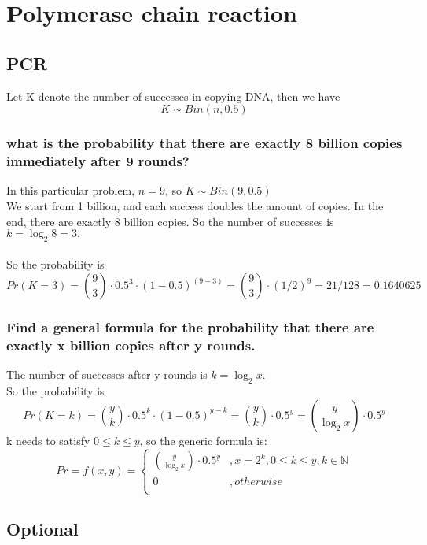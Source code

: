 \documentclass{article}
\date{February 2018}
\begin{document}
\section{Polymerase chain reaction}

\subsection{PCR}
Let K denote the number of successes in copying DNA, then we have 
\[
K \sim Bin(n, 0.5)
\]

\subsubsection{what is the probability that there are exactly 8 billion copies immediately after 9 rounds?}

In this particular problem, \( n = 9 \), so \( K \sim Bin(9, 0.5)\)\\
We start from 1 billion, and each success doubles the amount of copies. In the end, there are exactly 8 billion copies. So the number of successes is \( k = {\log_2 8} = 3. \) \\
\\
So the probability is \\
\[
Pr(K = 3) = {9 \choose 3} \cdot 0.5^3 \cdot (1 - 0.5)^{(9-3)} = {9 \choose 3} \cdot (1/2)^9 = 21/128 = 0.1640625
\]

\subsubsection{Find a general formula for the probability that there are exactly x billion copies after y rounds.}

The number of successes after y rounds is \( k = {\log_2 x} \). \\
So the probability is
\[
Pr(K = k) = {y \choose k} \cdot 0.5^k \cdot (1 - 0.5)^{y-k} = {y \choose k} \cdot 0.5^y = 
{y \choose {\log_2 x}} \cdot 0.5^y
\]
k needs to satisfy \( 0 \leq k \leq y\), so the generic formula is: \\
\[
Pr = f(x,y) = \left\{
\begin{array}{ll}
      {y \choose {\log_2 x}} \cdot 0.5^y & , x = 2^k, 0\leq k \leq y, k \in \mathbb{N} \\
      0 & , otherwise\\
\end{array} 
\right.
\]

\subsection{Optional}
\end{document}
